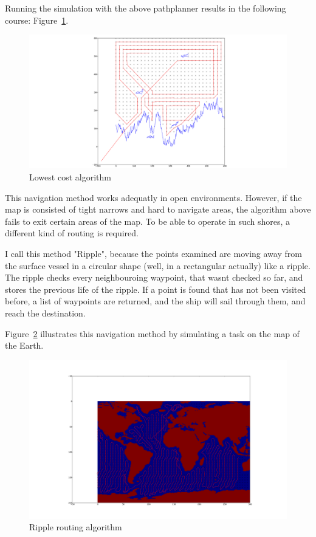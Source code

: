 Running the simulation with the above pathplanner results in the following course: Figure~\ref{fig:lc}.

\begin{figure}[H]
	\centering
	\includegraphics[width=\textwidth]{img/geee}
	\caption{Lowest cost algorithm}
	\label{fig:lc}
\end{figure}

This navigation method works adequatly in open environments. However, if the map is consisted of tight narrows and hard to navigate areas, the algorithm above fails to exit certain areas of the map. To be able to operate in such shores, a different kind of routing is required.

I call this method "Ripple", because the points examined are moving away from the surface vessel in a circular shape (well, in a rectangular actually) like a ripple. The ripple checks every neighbouroing waypoint, that wasnt checked so far, and stores the previous life of the ripple. If a point is found that has not been visited before, a list of waypoints are returned, and the ship will sail through them, and reach the destination.

Figure~\ref{fig:ripple} illustrates this navigation method by simulating a task on the map of the Earth.

\begin{figure}[H]
	\centering
	\includegraphics[width=\textwidth]{img/ripple}
	\caption{Ripple routing algorithm}
	\label{fig:ripple}
\end{figure}

